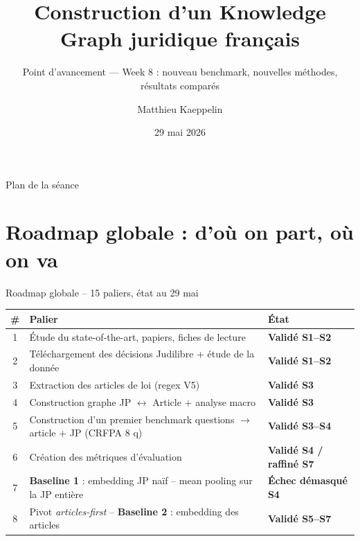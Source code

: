 \documentclass[aspectratio=169,10pt]{beamer}
\title[KG juridique FR --- Week 8]{Construction d'un Knowledge Graph juridique français}
\subtitle{Point d'avancement --- Week 8 : nouveau benchmark, nouvelles méthodes, résultats comparés}
\author{Matthieu Kaeppelin}
\institute{Stage FE Recherche}
\date{29 mai 2026}
\begin{document}
\begin{frame}
  \titlepage
\end{frame}

\begin{frame}{Plan de la séance}
  \tableofcontents[hideallsubsections]
\end{frame}

\section{Roadmap globale : d'où on part, où on va}

\begin{frame}{Roadmap globale -- 15 paliers, état au 29 mai}
  \scriptsize
  \renewcommand{\arraystretch}{1.05}
  \begin{center}
  \begin{tabular}{@{}c p{8.5cm} l@{}}
    \toprule
    \textbf{\#} & \textbf{Palier} & \textbf{État} \\
    \midrule
    1  & Étude du state-of-the-art, papiers, fiches de lecture                        & \textcolor{ok}{\textbf{Validé S1--S2}} \\
    2  & Téléchargement des décisions Judilibre + étude de la donnée                  & \textcolor{ok}{\textbf{Validé S1--S2}} \\
    3  & Extraction des articles de loi (regex V5)                                    & \textcolor{ok}{\textbf{Validé S3}} \\
    4  & Construction graphe JP $\leftrightarrow$ Article + analyse macro            & \textcolor{ok}{\textbf{Validé S3}} \\
    5  & Construction d'un premier benchmark questions $\to$ article + JP (CRFPA 8 q) & \textcolor{ok}{\textbf{Validé S3--S4}} \\
    6  & Création des métriques d'évaluation                                          & \textcolor{ok}{\textbf{Validé S4 / raffiné S7}} \\
    7  & \textbf{Baseline 1} : embedding JP naïf -- mean pooling sur la JP entière    & \textcolor{warn}{\textbf{Échec démasqué S4}} \\
    \rowcolor{accentsoft}
    8  & Pivot \emph{articles-first} -- \textbf{Baseline 2} : embedding des articles  & \textcolor{ok}{\textbf{Validé S5--S7}} \\

\end{tabular}
\end{center}
\end{frame}
\end{document}
